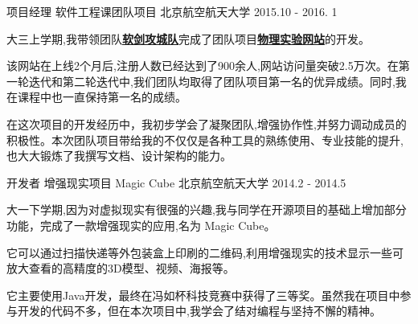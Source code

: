 


\begin{cventries}


\cventry
{项目经理} %
{软件工程课团队项目} %
{北京航空航天大学} %
{2015.10 - 2016. 1} %
{ %
\begin{cvitems}
\item {大三上学期,我带领团队\href{http://www.cnblogs.com/buaase}{\textbf{软剑攻城队}}完成了团队项目\href{http://buaaphylab.com/}{\textbf{物理实验网站}}的开发。}
\item {该网站在上线2个月后,注册人数已经达到了900余人,网站访问量突破2.5万次。在第一轮迭代和第二轮迭代中,我们团队均取得了团队项目第一名的优异成绩。同时,我在课程中也一直保持第一名的成绩。}
\item {在这次项目的开发经历中，我初步学会了凝聚团队,增强协作性,并努力调动成员的积极性。本次团队项目带给我的不仅仅是各种工具的熟练使用、专业技能的提升,也大大锻炼了我撰写文档、设计架构的能力。}
\end{cvitems}
}

\cventry
{开发者} %
{增强现实项目 Magic Cube} %
{北京航空航天大学} %
{2014.2 - 2014.5 } %
{ %
	\begin{cvitems}
		\item {大一下学期,因为对虚拟现实有很强的兴趣,我与同学在开源项目的基础上增加部分功能，完成了一款增强现实的应用,名为 Magic Cube。}
		\item {它可以通过扫描快递等外包装盒上印刷的二维码,利用增强现实的技术显示一些可放大查看的高精度的3D模型、视频、海报等。}
		\item {它主要使用Java开发，最终在冯如杯科技竞赛中获得了三等奖。虽然我在项目中参与开发的代码不多，但在本次项目中,我学会了结对编程与坚持不懈的精神。}
	\end{cvitems}
}



\end{cventries}
